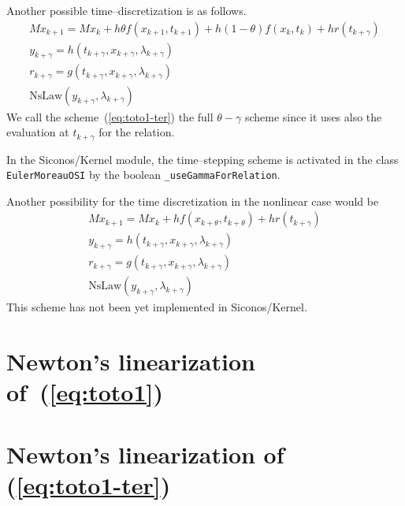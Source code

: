 Another possible time--discretization is as follows.
\begin{equation}
  \begin{array}{l}
    \label{eq:toto1-ter}
    M x_{k+1} = M x_{k} + h\theta f(x_{k+1},t_{k+1})+h(1-\theta) f(x_k,t_k) + h r(t_{k+\gamma}) \\[2mm]
    y_{k+\gamma} = h(t_{k+\gamma},x_{k+\gamma},\lambda _{k+\gamma}) \\[2mm]
    r_{k+\gamma} = g(t_{k+\gamma},x_{k+\gamma},\lambda _{k+\gamma})\\[2mm]
    \mbox{NsLaw} ( y_{k+\gamma} , \lambda_{k+\gamma})
  \end{array}
\end{equation}
We call the scheme~(\ref{eq:toto1-ter}) the full $\theta-\gamma$ scheme since it uses also the evaluation at $t_{k+\gamma}$ for the relation.

In the Siconos/Kernel module, the time--stepping scheme is activated in the class {\tt EulerMoreauOSI} by the boolean {\tt \_useGammaForRelation}.


Another possibility for the time discretization in the nonlinear case would be
\begin{equation}
  \begin{array}{l}
    \label{eq:toto1-quat}
    M x_{k+1} = M x_{k} +h f(x_{k+\theta},t_{k+\theta}) + h r(t_{k+\gamma}) \\[2mm]
    y_{k+\gamma} =  h(t_{k+\gamma},x_{k+\gamma},\lambda _{k+\gamma}) \\[2mm]
    r_{k+\gamma} = g(t_{k+\gamma},x_{k+\gamma},\lambda _{k+\gamma})\\[2mm]
    \mbox{NsLaw} ( y_{k+\gamma} , \lambda_{k+\gamma})
  \end{array}
\end{equation}
This scheme has not been yet implemented in Siconos/Kernel.

\clearpage
\section{Newton's linearization of~(\ref{eq:toto1})}


%








\section{Newton's linearization of~ (\ref{eq:toto1-ter}) }



